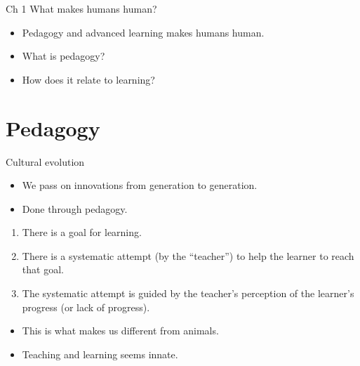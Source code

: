 \begin{frame}
  \begin{block}{Ch 1 What makes humans human?}
    \begin{itemize}
      \item Pedagogy and advanced learning makes humans human.
      \item What is pedagogy?
      \item How does it relate to learning?
    \end{itemize}
  \end{block}
\end{frame}


\section{Pedagogy}

\begin{frame}
  \begin{block}{Cultural evolution}
    \begin{itemize}
      \item We pass on innovations from generation to generation.
      \item Done through pedagogy.
    \end{itemize}
  \end{block}
\end{frame}

\begin{frame}
  \begin{definition}
    \begin{enumerate}
      \item There is a goal for learning.
      \item There is a systematic attempt (by the \enquote{teacher}) to help 
        the learner to reach that goal.
      \item The systematic attempt is guided by the teacher's perception of the 
        learner's progress (or lack of progress).
    \end{enumerate}
  \end{definition}

  \pause

  \begin{remark}
    \begin{itemize}
      \item This is what makes us different from animals.
      \item Teaching and learning seems innate.
    \end{itemize}
  \end{remark}
\end{frame}

